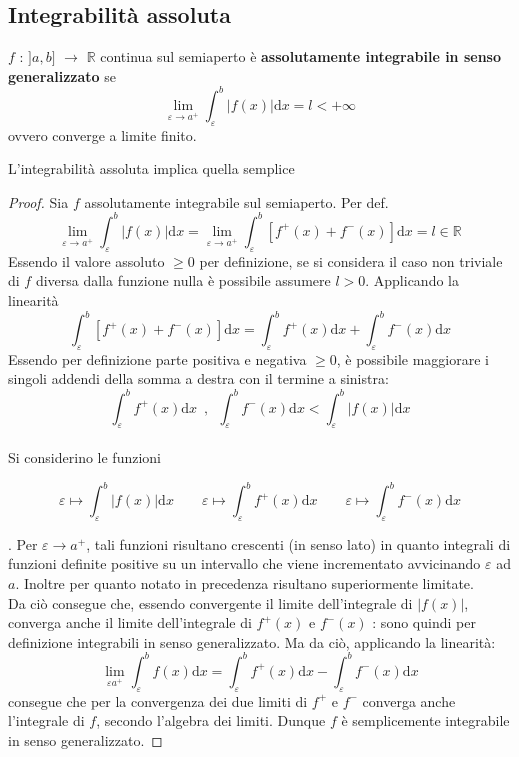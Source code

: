 \documentclass[10pt, oneside]{book}
\theoremstyle{plain}
\begin{document}
\subsection{Integrabilità assoluta}
\begin{defin}
    $f$ : $]a,b]$ $\rightarrow$ $\mathbb{R}$ continua sul semiaperto è \textbf{assolutamente integrabile in senso generalizzato} se 
    \[\lim\limits_{\varepsilon \rightarrow a^+} \int_{\varepsilon}^{b} |f(x)|\textrm{d}x = l < + \infty\]
    ovvero converge a limite finito.
\end{defin}
\begin{prop}
    L'integrabilità assoluta implica quella semplice
\end{prop}
\begin{proof}
    Sia $f$ assolutamente integrabile sul semiaperto. Per def.
    \[\lim\limits_{\varepsilon \rightarrow a^+} \int_{\varepsilon}^{b} |f(x)|\textrm{d}x = \lim\limits_{\varepsilon \rightarrow a^+} \int_{\varepsilon}^{b} [f^+(x) + f^-(x)]\textrm{d}x = l \in \mathbb{R}\]
    Essendo il valore assoluto $\geq 0$ per definizione, se si considera il caso non triviale di $f$ diversa dalla funzione nulla è possibile assumere $l>0$. Applicando la linearità 
    \[\int_{\varepsilon}^{b} [f^+(x) + f^-(x)]\textrm{d}x = \int_{\varepsilon}^{b} f^+(x)\textrm{d}x + \int_{\varepsilon}^{b} f^-(x)\textrm{d}x\]
    Essendo per definizione parte positiva e negativa $\geq 0$, è possibile maggiorare i singoli addendi della somma a destra con il termine a sinistra:
    \[\int_{\varepsilon}^{b} f^+(x)\textrm{d}x \enspace, \enspace \int_{\varepsilon}^{b} f^-(x)\textrm{d}x < \int_{\varepsilon}^{b} |f(x)|\textrm{d}x\]
    \\Si considerino le funzioni 
    
\[\varepsilon \mapsto \int_{\varepsilon}^{b} |f(x)|\textrm{d}x \qquad \varepsilon \mapsto \int_{\varepsilon}^{b} f^+(x)\textrm{d}x \qquad \varepsilon \mapsto \int_{\varepsilon}^{b} f^-(x)\textrm{d}x\]

. Per $\varepsilon \rightarrow a^+$, tali funzioni risultano crescenti (in senso lato) in quanto integrali di funzioni definite positive su un intervallo che viene incrementato avvicinando $\varepsilon$ ad $a$. Inoltre per quanto notato in precedenza risultano superiormente limitate.
    \\Da ciò consegue che, essendo convergente il limite dell'integrale di $|f(x)|$, converga anche il limite dell'integrale di $f^+(x)$ e $f^-(x)$ : sono quindi per definizione integrabili in senso generalizzato. Ma da ciò, applicando la linearità:
    \[\lim\limits_{\varepsilon a^+} \int_{\varepsilon}^{b} f(x)\textrm{d}x = \int_{\varepsilon}^{b} f^+(x)\textrm{d}x - \int_{\varepsilon}^{b} f^-(x)\textrm{d}x\]
    consegue che per la convergenza dei due limiti di $f^+$ e $f^-$ converga anche l'integrale di $f$, secondo l'algebra dei limiti. Dunque $f$ è semplicemente integrabile in senso generalizzato.
\end{proof}
\end{document}
